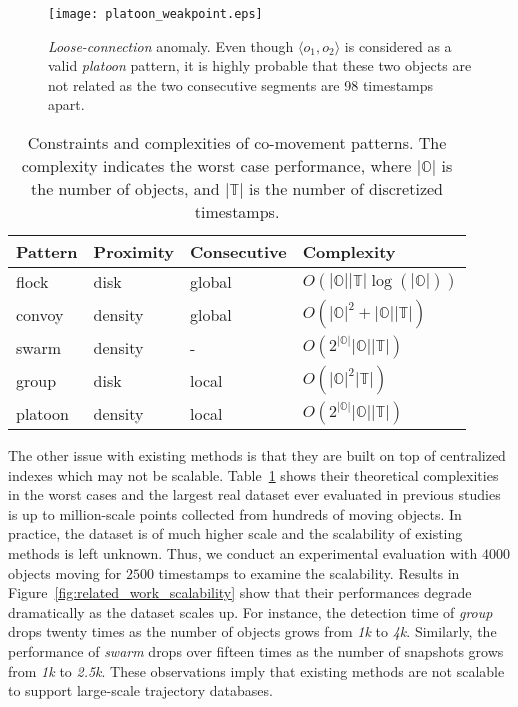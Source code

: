 \begin{figure}[h]
\center
\texttt{[image: platoon\_weakpoint.eps]}
\caption{\emph{Loose-connection} anomaly. Even though $\langle o_1, o_2\rangle$ is considered as a valid \emph{platoon} pattern, it is highly probable that these two objects are not related as the two consecutive segments  are 98 timestamps apart. 
}
\label{fig:platoon_weakpoint}
\end{figure}

\begin{table}[t]
\centering
\caption{Constraints and complexities of co-movement patterns. The complexity indicates the worst case performance, where $|\mathbb{O}|$ is the number of objects, and $|\mathbb{T}|$ is the number of discretized timestamps.}
\label{tbl:existing_co_patterns}
\begin{tabular}{|p{1.5cm}|p{1.4cm}|p{1.7cm}|p{2.2cm}|}
\hline 
{\small \textbf{Pattern}} & {\small \textbf{Proximity}} & {\small \textbf{Consecutive}} & {\small \textbf{Complexity}}\\ 
\hline 
flock~\cite{gudmundsson2006flock} & disk &  global & {\small $O(|\mathbb{O}||\mathbb{T}|\log(|\mathbb{O}|))$} \\ 
\hline 
convoy~\cite{jeung2008convoy} & density &   global & {\small $O(|\mathbb{O}|^2+|\mathbb{O}||\mathbb{T}|)$}\\ 
\hline 
swarm~\cite{li2010swarm} & density  & - & {\small $O(2^{|\mathbb{O}|}|\mathbb{O}||\mathbb{T}|)$}  \\ 
\hline 
group~\cite{wang2006grouppattern} & disk &  local & {\small $O(|\mathbb{O}|^2|\mathbb{T}|)$}\\ 
\hline 
platoon~\cite{li2015platoon} & density &  local & {\small $O(2^{|\mathbb{O}|}|\mathbb{O}||\mathbb{T}|)$}\\ 
\hline 
\end{tabular} 
\end{table}

The other issue with existing methods is that they are built on top of centralized indexes which may not be scalable. Table~\ref{tbl:existing_co_patterns} shows their theoretical complexities in the worst cases and the largest real dataset ever evaluated in previous studies is up to million-scale points collected from hundreds of moving objects. In practice, the dataset is of much higher scale and the scalability of existing methods is left unknown. Thus, we conduct an experimental evaluation with $4000$ objects moving for $2500$ timestamps to examine the scalability. Results in Figure~\ref{fig:related_work_scalability} show that their performances degrade dramatically as the dataset scales up. For instance, the detection time of \emph{group} drops twenty times as the number of objects grows from \emph{1k} to \emph{4k}. Similarly,
the performance of \emph{swarm} drops over fifteen times as the number of snapshots grows from \emph{1k} to \emph{2.5k}.
These observations imply that existing methods are not scalable to support large-scale trajectory databases. 

